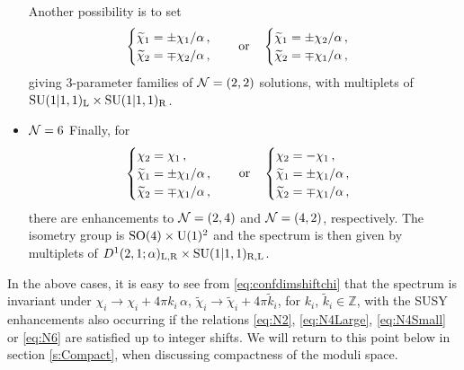 \documentclass[a4paper, 11pt]{article}
\numberwithin{equation}{section}
\newcommand{\ts}[1]{\widetilde{#1}}
\newcommand{\SU}[1]{\mathrm{SU}( #1 )}
\newcommand{\SO}[1]{\mathrm{SO}( #1 )}
\newcommand{\+}{\oplus}
\begin{document}
\begin{itemize}
	Another possibility is to set
	\begin{equation} \label{eq:N4Small}
		\begin{cases}
			\ts{\chi}_{1} = \pm \chi_{1}/\alpha\,,\\
			\ts{\chi}_{2} = \mp \chi_{2}/\alpha\,,
		\end{cases}
		\quad {\rm or}\quad
		\begin{cases}
			\ts{\chi}_{1} = \pm \chi_{2}/\alpha\,,\\
			\ts{\chi}_{2} = \mp \chi_{1}/\alpha\,,
		\end{cases}
	\end{equation}
	giving 3-parameter families of ${\cal N}=(2,2)$ solutions, with multiplets of $\SU{1\vert1,1}_{\rm L}\times\SU{1\vert1,1}_{\rm R}$.
	\item {\boldmath ${\cal N}=6$} Finally, for
	\begin{equation} \label{eq:N6}
		\begin{cases}
			\chi_{2} = \chi_{1}\,,\\
			\ts{\chi}_{1} = 
			\pm \chi_{1}
			/\alpha\,,\\
			\ts{\chi}_{2} = 
			\mp \chi_{1}
			/\alpha\,,
		\end{cases}
		\quad {\rm or}\quad
		\begin{cases}
			\chi_{2} = -\chi_{1}\,,\\
			\ts{\chi}_{1} = 
			\pm \chi_{1}
			/\alpha\,,\\
			\ts{\chi}_{2} = 
			\mp \chi_{1}
			/\alpha\,,
		\end{cases}
	\end{equation}
	there are enhancements to ${\cal N}=(2,4)$ and ${\cal N}=(4,2)$, respectively. The isometry group is $\SO{4}\times {\rm U}(1)^{2}$ and the spectrum is then given by multiplets of $D^{1}(2,1;\alpha)_{\rm L, R}\times\SU{1\vert1,1}_{\rm R,L}$.
\end{itemize}

In the above cases, it is easy to see from \eqref{eq:confdimshiftchi} that the spectrum  is invariant under $\chi_i \rightarrow \chi_i + 4\pi k_i\,\alpha$, $\ts{\chi}_i \rightarrow \ts{\chi}_i + 4\pi \ts{k}_i$, for $k_i$, $\ts{k}_i \in \mathbb{Z}$, with the SUSY enhancements also occurring if the relations \eqref{eq:N2}, \eqref{eq:N4Large}, \eqref{eq:N4Small} or \eqref{eq:N6} are satisfied up to integer shifts. We will return to this point below in section \ref{s:Compact}, when discussing compactness of the moduli space.
\end{document}
